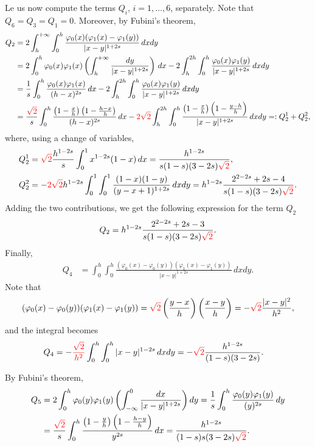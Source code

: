 \documentclass[11 pt]{article}
\numberwithin{equation}{section}
\newcommand{\B}[1]{{\color{red} #1}}  %
\begin{document}
Le us now compute the terms $Q_i$, $i=1,\ldots,6$, separately.   Note that $Q_6=Q_3=Q_1 = 0.$ Moreover, by Fubini's theorem,
\begin{align*}
	Q_2 &= 2\int_{h}^{+\infty}\int_{0}^{h} \frac{\varphi_0(x)(\varphi_{1}(x)-\varphi_{1}(y))}{|x-y|^{1+2s}}\,dxdy\\
	&= 2\int_{0}^{h}\varphi_0(x)\varphi_{1}(x)\left(\int_{h}^{+\infty} \frac{dy}{|x-y|^{1+2s}}\right)\,dx - 2\int_{h}^{2h}\int_{0}^{h} \frac{\varphi_0(x)\varphi_{1}(y)}{|x-y|^{1+2s}}\,dxdy 
	\\
	&= \frac{1}{s}\int_{0}^{h}\frac{\varphi_0(x)\varphi_{1}(x)}{(h-x)^{2s}}\,dx - 2\int_{h}^{2h}\int_{0}^{h} \frac{\varphi_0(x)\varphi_{1}(y)}{|x-y|^{1+2s}}\,dxdy
	\\
	&= \frac{\B{\sqrt{2}}}{s}\int_{0}^{h}\frac{\left(1-\frac{x}{h}\right)\left(1-\frac{h-x}{h}\right)}{(h-x)^{2s}}\,dx - \B{2\sqrt{2}}\int_{h}^{2h}\int_{0}^{h} \frac{\left(1-\frac{x}{h}\right)\left(1-\frac{y-h}{h}\right)}{|x-y|^{1+2s}}\,dxdy=:Q_2^1+Q_2^2,
\end{align*}
where, using a change of variables,
\begin{align*}
Q_2^1&=\B{\sqrt{2}}\frac{h^{1-2s}}{s}\int_0^1 x^{1-2s}(1-x)\,dx = \frac{h^{1-2s}}{s(1-s)(3-2s)\B{\sqrt{2}}},\\
Q_2^2 &= -\B{2\sqrt{2}}h^{1-2s}\int_0^1\int_0^1\frac{(1-x)(1-y)}{(y-x+1)^{1+2s}}\,dxdy = h^{1-2s}\frac{2^{2-2s}+2s-4}{s(1-s)(3-2s)\B{\sqrt{2}}}.
\end{align*}
Adding the two contributions, we get the following expression for the term $Q_2$
\begin{align*}
	Q_2 = h^{1-2s}\frac{2^{2-2s}+2s-3}{s(1-s)(3-2s)\B{\sqrt{2}}}.
\end{align*}
Finally, 
\begin{align*}
	Q_4 &= \int_{0}^{h}\int_{0}^{h} \frac{(\varphi_0(x)-\varphi_0(y))(\varphi_{1}(x)-\varphi_{1}(y))}{|x-y|^{1+2s}}\,dxdy. 
\end{align*}
Note that
\begin{align*}
	(\varphi_0(x)-\varphi_0(y))(\varphi_{1}(x)-\varphi_{1}(y)) = \B{\sqrt{2}}\left(\frac{y-x}{h}\right)\left(\frac{x-y}{h}\right) = -\B{\sqrt{2}}\frac{|x-y|^2}{h^2},
\end{align*}
and the integral becomes
\begin{align*}
	Q_4 &= -\B{\frac{\sqrt{2}}{h^2}}\int_{0}^{h}\int_{0}^{h} |x-y|^{1-2s}\,dxdy = -\B{\sqrt{2}}\frac{h^{1-2s}}{(1-s)(3-2s)}.
\end{align*}

By Fubini's theorem,
\begin{align*}
	Q_5 &= 2\int_{0}^{h}\varphi_0(y)\varphi_{1}(y)\left(\int_{-\infty}^{0} \frac{dx}{|x-y|^{1+2s}}\right)dy = \frac{1}{s}\int_{0}^{h}\frac{\varphi_0(y)\varphi_{1}(y)}{(y)^{2s}}\,dy \\
	&= \frac{\B{\sqrt{2}}}{s}\int_{0}^{h}\frac{\left(1-\frac{y}{h}\right)\left(1-\frac{h-y}{h}\right)}{y^{2s}}\,dx=\frac{h^{1-2 s}}{(1-s) s (3-2 s)\B{\sqrt{2}}}.
\end{align*}
\end{document}
